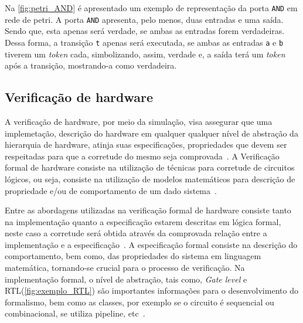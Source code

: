 \par
Na \autoref{fig:petri_AND} é apresentado um exemplo de representação da porta \texttt{AND} em rede de petri. A porta \texttt{AND} apresenta, pelo menos, duas entradas e uma saída. Sendo que, esta apenas será verdade, se ambas as entradas forem verdadeiras. Dessa forma, a transição \texttt{t} apenas será executada, se ambas as entradas \texttt{a} e \texttt{b} tiverem um \textit{token} cada, simbolizando, assim, verdade e, a saída terá um \textit{token} após a transição, mostrando-a como verdadeira.
\subsection{Verificação de hardware}

A verificação de hardware, por meio da simulação, visa assegurar que uma implemetação, descrição do hardware em qualquer qualquer nível de abstração da hierarquia de hardware, atinja suas especificações, propriedades que devem ser respeitadas para que a corretude do mesmo seja comprovada~\cite{gupta1992formal}. A Verificação formal de hardware consiste na utilização 
de técnicas para corretude de circuitos lógicos, ou seja, consiste na utilização de modelos matemáticos para descrição de propriedade e/ou de comportamento de um dado sistema~\cite{kropf2013introduction}.

\par
Entre as abordagens utilizadas na verificação formal de hardware consiste tanto na implementação quanto a especificação estarem descritas em lógica formal, neste caso a corretude será obtida através da comprovada relação entre a implementação e a especificação~\cite{seger1992introduction}. A especificação formal consiste na descrição do comportamento, bem como, das propriedades do sistema em linguagem matemática, tornando-se crucial para o processo de verificação. Na implementação formal, o nível de abstração, tais como, \textit{Gate level} e RTL(\autoref{fig:exemplo_RTL}) são importantes informações para o desenvolvimento do formalismo, bem como as classes, por exemplo se o circuito é sequencial ou combinacional, se utiliza pipeline, etc~\cite{kropf2013introduction}.

